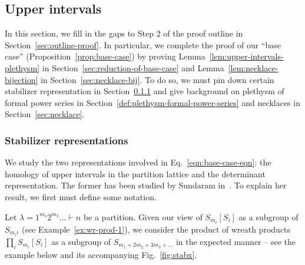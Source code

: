 \documentclass[ALCO, Unicode]{cedram}
\begin{document}
 \subsection{Upper intervals}\label{sec:base-case}
In this section, we fill in the gaps to Step 2 of the proof outline in Section~\ref{sec:outline-proof}. In particular, we complete the proof of our ``base case'' (Proposition~\ref{prop:base-case}) by proving  Lemma~\ref{lem:upper-intervals-plethysm} in Section~\ref{sec:reduction-of-base-case} and Lemma~\ref{lem:necklace-bijection} in Section~\ref{sec:necklace-bij}. To do so, we must pin down certain stabilizer representation in Section~\ref{sec:stabilizer-reps} and give background on plethysm of formal power series in Section~\ref{def:plethysm-formal-power-series} and necklaces in Section~\ref{sec:necklace}.


\subsubsection{Stabilizer representations}\label{sec:stabilizer-reps}

We study the two representations involved in Eq.~\eqref{eqn:base-case-eqn}: the homology of upper intervals in the partition lattice and the determinant representation. The former has been studied by Sundaram in~\cite{SundaramAdvances}. To explain her result, we first must define some notation.

Let $\lambda = 1^{m_1}2^{m_2}\ldots \vdash n$ be a partition. Given our view of $S_{m_i}[S_i]$ as a subgroup of $S_{m_i i}$ (see Example~\ref{ex:wr-prod-1}), we consider the product of wreath products $\prod_{i}S_{m_i}[S_i]$ as a subgroup of $S_{m_1 + 2 m_2 + 3 m_3 + \ldots}$ in the expected manner -- see the example below and its accompanying Fig.~\ref{fig:stabx}.
\end{document}
